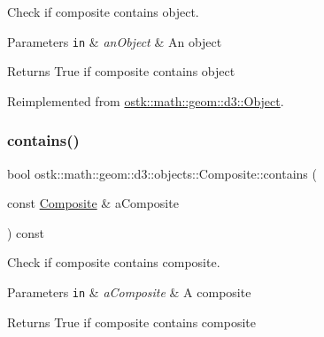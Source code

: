 Check if composite contains object. 


\begin{DoxyParams}[1]{Parameters}
\mbox{\tt in}  & {\em an\+Object} & An object \\
\hline
\end{DoxyParams}
\begin{DoxyReturn}{Returns}
True if composite contains object 
\end{DoxyReturn}


Reimplemented from \hyperlink{classostk_1_1math_1_1geom_1_1d3_1_1_object_a97edbd679b50c4663d3ab20c65cea4b9}{ostk\+::math\+::geom\+::d3\+::\+Object}.

\mbox{\label{classostk_1_1math_1_1geom_1_1d3_1_1objects_1_1_composite_a54395e684abc0b64a629808e3c478e52}} 
\subsubsection{\texorpdfstring{contains()}{contains()}\hspace{0.1cm}{\footnotesize\ttfamily [2/2]}}
{\footnotesize\ttfamily bool ostk\+::math\+::geom\+::d3\+::objects\+::\+Composite\+::contains (\begin{DoxyParamCaption}\item[{const \hyperlink{classostk_1_1math_1_1geom_1_1d3_1_1objects_1_1_composite}{Composite} \&}]{a\+Composite }\end{DoxyParamCaption}) const}



Check if composite contains composite. 


\begin{DoxyParams}[1]{Parameters}
\mbox{\tt in}  & {\em a\+Composite} & A composite \\
\hline
\end{DoxyParams}
\begin{DoxyReturn}{Returns}
True if composite contains composite 
\end{DoxyReturn}
\mbox{\label{classostk_1_1math_1_1geom_1_1d3_1_1objects_1_1_composite_ab6ca471e3e731465d64148506869c93d}} 
